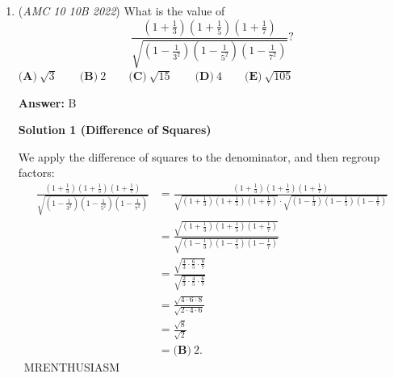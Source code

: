 \begin{enumerate}
We can add $7\cdot500=3500$ and then minus $5$ seconds.
 \begin{align*} 4:00+3500\text{ seconds} &= 4:00+3600\text{ seconds }-100\text{ seconds} \\ &=4:00+1\text{ hour }-100\text{ seconds} \\ &=5:00-100\text{ seconds} \\ &=20 \text{ seconds after } 4:58. \end{align*}
Finally, we minus $5$ seconds giving $\boxed{\textbf{(A) }15 \text{ seconds after } 4:58}$.

 


 


	\item (\textit{AMC 10 10B 2022}) What is the value of 
 \[\frac{\left(1+\frac13\right)\left(1+\frac15\right)\left(1+\frac17\right)}{\sqrt{\left(1-\frac{1}{3^2}\right)\left(1-\frac{1}{5^2}\right)\left(1-\frac{1}{7^2}\right)}}?\]
$\textbf{(A)}\ \sqrt3 \qquad\textbf{(B)}\ 2 \qquad\textbf{(C)}\ \sqrt{15} \qquad\textbf{(D)}\ 4 \qquad\textbf{(E)}\ \sqrt{105}$

 \textbf{Answer: }B



\textbf{Solution 1 (Difference of Squares)}

We apply the difference of squares to the denominator, and then regroup factors:
 \begin{align*} \frac{\left(1+\frac13\right)\left(1+\frac15\right)\left(1+\frac17\right)}{\sqrt{\left(1-\frac{1}{3^2}\right)\left(1-\frac{1}{5^2}\right)\left(1-\frac{1}{7^2}\right)}} &= \frac{\left(1+\frac13\right)\left(1+\frac15\right)\left(1+\frac17\right)}{\sqrt{\left(1+\frac13\right)\left(1+\frac15\right)\left(1+\frac17\right)}\cdot\sqrt{\left(1-\frac13\right)\left(1-\frac15\right)\left(1-\frac17\right)}} \\ &= \frac{\sqrt{\left(1+\frac13\right)\left(1+\frac15\right)\left(1+\frac17\right)}}{\sqrt{\left(1-\frac13\right)\left(1-\frac15\right)\left(1-\frac17\right)}} \\ &= \frac{\sqrt{\frac43\cdot\frac65\cdot\frac87}}{\sqrt{\frac23\cdot\frac45\cdot\frac67}} \\ &= \frac{\sqrt{4\cdot6\cdot8}}{\sqrt{2\cdot4\cdot6}} \\ &= \frac{\sqrt8}{\sqrt2} \\ &= \boxed{\textbf{(B)}\ 2}. \end{align*}
~MRENTHUSIASM

 




\end{enumerate}
